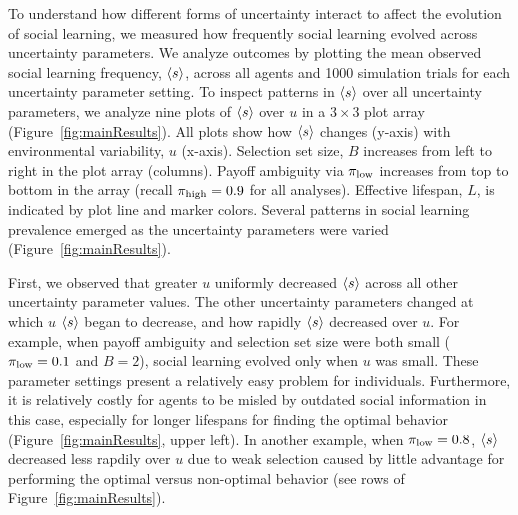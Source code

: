 \documentclass[letterpaper,11.5pt]{scrartcl}
\begin{document}
To understand how different forms of uncertainty interact to affect the evolution of
social learning, we measured how frequently social learning evolved across
uncertainty parameters. We analyze outcomes by plotting the mean observed social
learning frequency, $\langle s \rangle$, across all agents and 1000 simulation trials for each
uncertainty parameter setting.   
To inspect patterns in $\langle s \rangle$ over all uncertainty parameters, we analyze nine
plots of $\langle s \rangle$ over $u$ in a $3\times3$ plot array
(Figure~\ref{fig:mainResults}). All plots show how $\langle s \rangle$ changes (y-axis)
with environmental variability, $u$ (x-axis). Selection set size, $B$ increases
from left to right in the plot array (columns). Payoff ambiguity via $\pi_{\mathrm{low}}$ 
increases from top to bottom in the array (recall $\pi_{\mathrm{high}}=0.9$ for all analyses).
Effective lifespan, $L$, is indicated by plot line and marker colors. 
Several patterns in social learning prevalence emerged as 
the uncertainty parameters were varied (Figure~\ref{fig:mainResults}). 

First, we observed that greater $u$ uniformly decreased
$\langle s \rangle$ across all other uncertainty parameter values. The other uncertainty
parameters changed at which $u$ $\langle s \rangle$ began to decrease,
and how rapidly $\langle s \rangle$ decreased over $u$. For example, 
when payoff ambiguity and selection set size were
both small ($\pi_{\mathrm{low}} = 0.1$ and $B=2$), social learning evolved only when $u$ was
small. These parameter settings present a relatively easy problem for individuals.
Furthermore, it is relatively costly for agents to be misled by outdated social 
information in this case, especially for longer lifespans for finding the 
optimal behavior (Figure~\ref{fig:mainResults}, upper left). 
In another example, when $\pi_{\mathrm{low}} = 0.8$, $\langle s \rangle$ decreased less rapdily over $u$ due to 
weak selection caused by little advantage for performing the optimal versus
non-optimal behavior (see rows of Figure~\ref{fig:mainResults}). 
\end{document}
